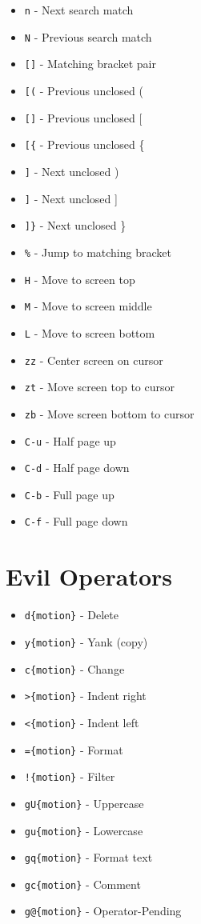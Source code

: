 \documentclass[6pt,landscape]{article}
\newcommand{\key}[1]{\texttt{#1}}
\begin{document}
\begin{multicols*}{5}
\begin{itemize}
\item \key{n} - Next search match
\item \key{N} - Previous search match
\item \key{[]} - Matching bracket pair
\item \key{[(} - Previous unclosed (
\item \key{[]} - Previous unclosed [
\item \key{[\{} - Previous unclosed \{
\item \key{]\)} - Next unclosed )
\item \key{]\]} - Next unclosed ]
\item \key{]\}} - Next unclosed \}
\item \key{\%} - Jump to matching bracket
\item \key{H} - Move to screen top
\item \key{M} - Move to screen middle
\item \key{L} - Move to screen bottom
\item \key{zz} - Center screen on cursor
\item \key{zt} - Move screen top to cursor
\item \key{zb} - Move screen bottom to cursor
\item \key{C-u} - Half page up
\item \key{C-d} - Half page down
\item \key{C-b} - Full page up
\item \key{C-f} - Full page down
\end{itemize}  

\section*{Evil Operators}
\begin{itemize}[leftmargin=*,itemsep=0pt,parsep=0pt,topsep=0pt]
\item \key{d\{motion\}} - Delete
\item \key{y\{motion\}} - Yank (copy)
\item \key{c\{motion\}} - Change
\item \key{>\{motion\}} - Indent right
\item \key{<\{motion\}} - Indent left
\item \key{=\{motion\}} - Format
\item \key{!\{motion\}} - Filter
\item \key{gU\{motion\}} - Uppercase
\item \key{gu\{motion\}} - Lowercase
\item \key{gq\{motion\}} - Format text
\item \key{gc\{motion\}} - Comment
\item \key{g@\{motion\}} - Operator-Pending
\end{itemize}


\end{multicols*}
\end{document}

